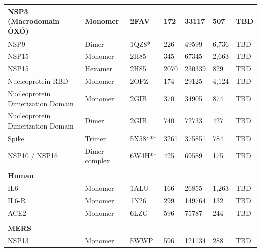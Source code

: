 \documentclass[../main.tex]{subfiles}
\begin{document}
\begin{table}[]
{\begin{tabular}{|l|l|p{2.5cm}|l|l|l|p{2.5cm}|}
                NSP3 (Macrodomain ÒXÓ)            & Monomer        & 2FAV    & 172  & 33117  & 507    & TBD \\ \hline
                NSP9                              & Dimer          & 1QZ8*   & 226  & 49599  & 6,736  & TBD \\ \hline
                NSP15                             & Monomer        & 2H85    & 345  & 67345  & 2,663  & TBD \\ \hline
                NSP15                             & Hexamer        & 2H85    & 2070 & 230339 & 829    & TBD \\ \hline
                Nucleoprotein RBD                 & Monomer        & 2OFZ    & 174  & 29125  & 4,124  & TBD \\ \hline
                Nucleoprotein Dimerization Domain & Monomer        & 2GIB    & 370  & 34905  & 874    & TBD \\ \hline
                Nucleoprotein Dimerization Domain & Dimer          & 2GIB    & 740  & 72733  & 427    & TBD \\ \hline
                Spike                             & Trimer         & 5X58*** & 3261 & 375851 & 784    & TBD \\ \hline
                NSP10 / NSP16                     & Dimer complex  & 6W4H**  & 425  & 69589  & 175    & TBD \\ \hline
                                                  &                &         &      &        &        &     \\ \hline
                \textbf{Human}                    &                &         &      &        &        &     \\ \hline
                IL6                               & Monomer        & 1ALU    & 166  & 26855  & 1,263  & TBD \\ \hline
                IL6-R                             & Monomer        & 1N26    & 299  & 149764 & 132    & TBD \\ \hline
                ACE2                              & Monomer        & 6LZG    & 596  & 75787  & 244    & TBD \\ \hline
                                                  &                &         &      &        &        &     \\ \hline
                \textbf{MERS}                     &                &         &      &        &        &     \\ \hline
                NSP13                             & Monomer        & 5WWP    & 596  & 121134 & 288    & TBD \\ \hline

\end{tabular}}
\end{table}
\end{document}
